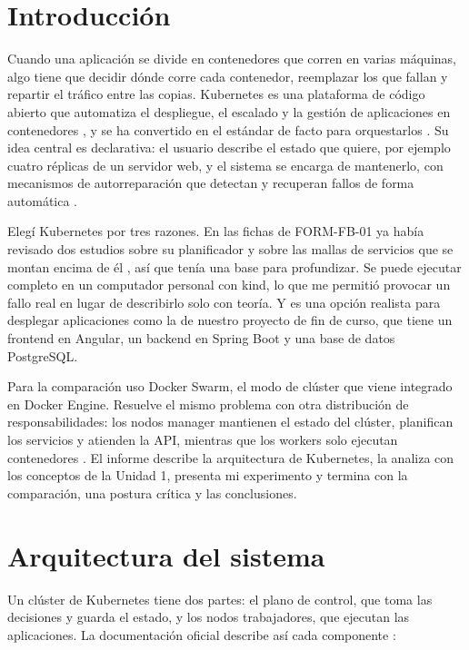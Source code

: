 \documentclass[11pt,a4paper]{article}
\begin{document}
\section{Introducción}

Cuando una aplicación se divide en contenedores que corren en varias máquinas, algo tiene que decidir dónde corre cada contenedor, reemplazar los que fallan y repartir el tráfico entre las copias. Kubernetes es una plataforma de código abierto que automatiza el despliegue, el escalado y la gestión de aplicaciones en contenedores \cite{senjab2023}, y se ha convertido en el estándar de facto para orquestarlos \cite{carrion2023}. Su idea central es declarativa: el usuario describe el estado que quiere, por ejemplo cuatro réplicas de un servidor web, y el sistema se encarga de mantenerlo, con mecanismos de autorreparación que detectan y recuperan fallos de forma automática \cite[p.~1]{senjab2023}.

Elegí Kubernetes por tres razones. En las fichas de FORM-FB-01 ya había revisado dos estudios sobre su planificador y sobre las mallas de servicios que se montan encima de él \cite{senjab2023,nicolasplata2024}, así que tenía una base para profundizar. Se puede ejecutar completo en un computador personal con kind, lo que me permitió provocar un fallo real en lugar de describirlo solo con teoría. Y es una opción realista para desplegar aplicaciones como la de nuestro proyecto de fin de curso, que tiene un frontend en Angular, un backend en Spring Boot y una base de datos PostgreSQL.

Para la comparación uso Docker Swarm, el modo de clúster que viene integrado en Docker Engine. Resuelve el mismo problema con otra distribución de responsabilidades: los nodos manager mantienen el estado del clúster, planifican los servicios y atienden la API, mientras que los workers solo ejecutan contenedores \cite{swarm_nodes}. El informe describe la arquitectura de Kubernetes, la analiza con los conceptos de la Unidad 1, presenta mi experimento y termina con la comparación, una postura crítica y las conclusiones.

\section{Arquitectura del sistema}

Un clúster de Kubernetes tiene dos partes: el plano de control, que toma las decisiones y guarda el estado, y los nodos trabajadores, que ejecutan las aplicaciones. La documentación oficial describe así cada componente \cite{k8s_components}:
\end{document}
